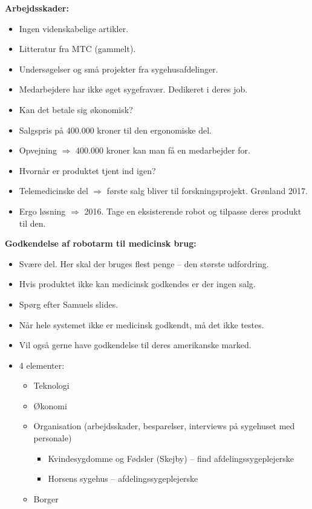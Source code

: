 \textbf{Arbejdsskader:}
\begin{itemize}
\item Ingen videnskabelige artikler. 
\item Litteratur fra MTC (gammelt).
\item Undersøgelser og små projekter fra sygehusafdelinger.
\item Medarbejdere har ikke øget sygefravær. Dedikeret i deres job. 
\end{itemize}
\begin{itemize}
\item Kan det betale sig økonomisk? 
\item Salgspris på 400.000 kroner til den ergonomiske del. 
\item Opvejning $\Rightarrow$ 400.000 kroner kan man få en medarbejder for. 
\item Hvornår er produktet tjent ind igen?
\item Telemedicinske del $\Rightarrow$ første salg bliver til forskningsprojekt. Grønland 2017.
\item Ergo løsning $\Rightarrow$ 2016. Tage en eksisterende robot og tilpasse deres produkt til den.
\end{itemize}
\textbf{Godkendelse af robotarm til medicinsk brug:}
\begin{itemize}
\item Svære del. Her skal der bruges flest penge – den største udfordring.
\item Hvis produktet ikke kan medicinsk godkendes er der ingen salg. 
\item Spørg efter Samuels slides.
\item Når hele systemet ikke er medicinsk godkendt, må det ikke testes. 
\item Vil også gerne have godkendelse til deres amerikanske marked.
\end{itemize}
\begin{itemize}
\item 4 elementer:
\begin{itemize}
\item Teknologi
\item Økonomi 
\item Organisation (arbejdsskader, besparelser, interviews på sygehuset med personale)
\begin{itemize}
\item Kvindesygdomme og Fødsler (Skejby) – find afdelingssygeplejerske
\item Horsens sygehus – afdelingssygeplejerske
\end{itemize}
\item Borger
\end{itemize}
\end{itemize}
